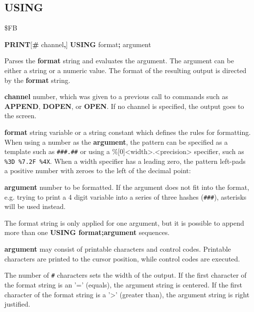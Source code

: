 \subsection{USING}
\begin{description}[leftmargin=2cm,style=nextline]
\item [Token:]    \$FB

\item [Format:]   {\bf PRINT}[{\bf\#} channel{\bf,}] {\bf USING} format{\bf;} argument

\item [Usage:]    Parses the {\bf format} string and evaluates the argument. The argument can be either a string or a numeric value. The format of the resulting output is directed by the {\bf format} string.

                  {\bf channel} number, which was given to a previous call to commands such as {\bf APPEND}, {\bf DOPEN}, or {\bf OPEN}. If no channel is specified, the output goes to the screen.

                  {\bf format} string variable or a string constant which defines the rules for formatting. When using a number as the {\bf argument}, the pattern can be specified as a template such as \texttt{\#\#\#.\#\#} or using a \%[0]<width>.<precision> specifier, such as \texttt{\%3D \%7.2F \%4X}. When a width specifier has a leading zero, the pattern left-pads a positive number with zeroes to the left of the decimal point: 

                  {\bf argument} number to be formatted. If the argument does not fit into the format, e.g. trying to print a 4 digit variable into a series of three hashes (\texttt{\#\#\#}), asterisks will be used instead.

\item [Remarks:]  The format string is only applied for one argument, but it is possible to append more than one {\bf USING format;argument} sequences.

                  {\bf argument} may consist of printable characters and control codes. Printable characters are printed to the cursor position, while control codes are executed.

                  The number of \texttt{\#} characters sets the width of the output. If the first character of the format string is an '=' (equals), the argument string is centered. If the first character of the format string is a '>' (greater than), the argument string is right justified.


\end{description}
